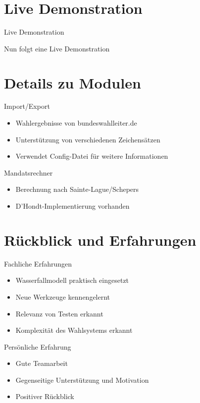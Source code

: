\documentclass[18pt]{beamer}
\begin{document}
\section{Live Demonstration}
\begin{frame}{Live Demonstration}
\begin{LARGE}
\begin{center}
	Nun folgt eine Live Demonstration
\end{center}
\end{LARGE}
\end{frame}


\section{Details zu Modulen}
\begin{frame}{Import/Export}
\begin{itemize}
	\item Wahlergebnisse von bundeswahlleiter.de
	\item Unterstützung von verschiedenen Zeichensätzen
	\item Verwendet Config-Datei für weitere Informationen
\end{itemize}
\end{frame}


\begin{frame}{Mandatsrechner}
\begin{itemize}
	\item Berechnung nach Sainte-Lague/Schepers
	\item D'Hondt-Implementierung vorhanden
\end{itemize}
\end{frame}

\section{Rückblick und Erfahrungen}
\begin{frame}{Fachliche Erfahrungen}
\begin{itemize}
	\item Wasserfallmodell praktisch eingesetzt
	\item Neue Werkzeuge kennengelernt
	\item Relevanz von Testen erkannt
	\item Komplexität des Wahlsystems erkannt
\end{itemize}
\end{frame}

\begin{frame}{Persönliche Erfahrung}
\begin{itemize}
	\item Gute Teamarbeit
	\item Gegenseitige Unterstützung und Motivation
	\item Positiver Rückblick
\end{itemize}
\end{frame}
\end{document}
